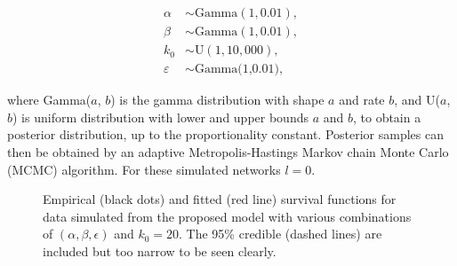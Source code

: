 \documentclass[
  sn-basic,
]{sn-jnl}
\theoremstyle{plain}
\theoremstyle{plain}
\theoremstyle{remark}
\begin{document}
\begin{align*}
\alpha&\sim \text{Gamma}(1,0.01),\\
\beta &\sim  \text{Gamma}(1,0.01),\\
k_0 &\sim \text{U}(1,10,000),\\
\varepsilon &\sim \text{Gamma(1,0.01)},
\end{align*}

where Gamma(\(a\), \(b\)) is the gamma distribution with shape \(a\) and
rate \(b\), and U(\(a\), \(b\)) is uniform distribution with lower and
upper bounds \(a\) and \(b\), to obtain a posterior distribution, up to
the proportionality constant. Posterior samples can then be obtained by
an adaptive Metropolis-Hastings Markov chain Monte Carlo (MCMC)
algorithm. For these simulated networks \(l=0\).

\begin{figure}


\caption{\label{fig-rec1}Empirical (black dots) and fitted (red line)
survival functions for data simulated from the proposed model with
various combinations of \((\alpha,\beta,\epsilon)\) and \(k_0=20\). The
95\% credible (dashed lines) are included but too narrow to be seen
clearly.}

\end{figure}%
\end{document}
